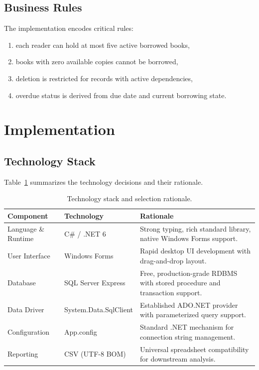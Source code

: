 \documentclass[12pt,a4paper]{article}
\begin{document}
\subsection{Business Rules}
The implementation encodes critical rules:
\begin{enumerate}[leftmargin=1.5cm]
    \item each reader can hold at most five active borrowed books,
    \item books with zero available copies cannot be borrowed,
    \item deletion is restricted for records with active dependencies,
    \item overdue status is derived from due date and current borrowing state.
\end{enumerate}

\section{Implementation}
\subsection{Technology Stack}
Table~\ref{tab:techstack} summarizes the technology decisions and their rationale.

\begin{table}[H]
\centering
\caption{Technology stack and selection rationale.}
\label{tab:techstack}
\begin{tabularx}{\textwidth}{p{3.2cm}p{4.0cm}X}
\toprule
\textbf{Component} & \textbf{Technology} & \textbf{Rationale} \\
\midrule
Language \& Runtime & C\# / .NET 6 & Strong typing, rich standard library, native Windows Forms support. \\
User Interface & Windows Forms & Rapid desktop UI development with drag-and-drop layout. \\
Database & SQL Server Express & Free, production-grade RDBMS with stored procedure and transaction support. \\
Data Driver & System.Data.SqlClient & Established ADO.NET provider with parameterized query support. \\
Configuration & App.config & Standard .NET mechanism for connection string management. \\
Reporting & CSV (UTF-8 BOM) & Universal spreadsheet compatibility for downstream analysis. \\
\bottomrule
\end{tabularx}
\end{table}
\end{document}
